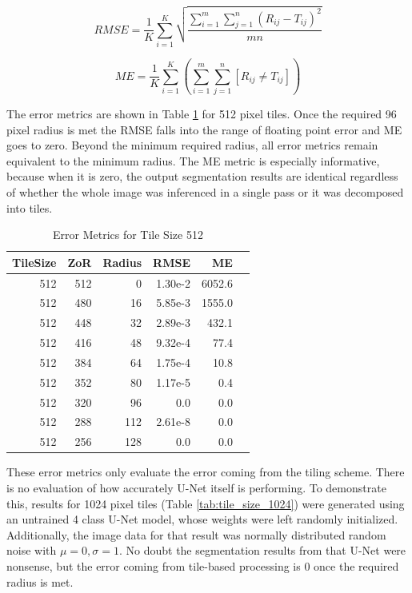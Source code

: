\documentclass[letterpaper]{article} %
\begin{document}
\begin{equation}
RMSE = \frac{1}{K} \sum_{i=1}^{K} \sqrt{ \frac{\sum_{i = 1}^{m} \sum_{j = 1}^{n} (R_{ij} - T_{ij})^2}{mn}}
\label{eq:rmse}
\end{equation}

\begin{equation}
ME = \frac{1}{K} \sum_{i=1}^{K} \left( \sum_{i = 1}^{m} \sum_{j = 1}^{n} [ R_{ij} \neq T_{ij} ] \right) 
\label{eq:me}
\end{equation}

The error metrics are shown in Table \ref{tab:tile_size_512} for 512 pixel tiles. Once the required 96 pixel radius is met the RMSE falls into the range of floating point error and ME goes to zero. Beyond the minimum required radius, all error metrics remain equivalent to the minimum radius. 
The ME metric is especially informative, because when it is zero, the output segmentation results are identical regardless of whether the whole image was inferenced in a single pass or it was decomposed into tiles. 

\begin{table}[h!]
	\centering
\caption{Error Metrics for Tile Size 512}
\label{tab:tile_size_512}
\begin{tabular}{rrrrrr}
	TileSize & ZoR & Radius & RMSE    & ME  \\ 
	\hline
512 & 512 & 0 & 1.30e-2 & 6052.6 \\
512 & 480 & 16 & 5.85e-3 & 1555.0 \\
512 & 448 & 32 & 2.89e-3 & 432.1 \\
512 & 416 & 48 & 9.32e-4 & 77.4 \\
512 & 384 & 64 & 1.75e-4 & 10.8 \\
512 & 352 & 80 & 1.17e-5 & 0.4 \\
512 & 320 & 96 & 0.0 & 0.0 \\
512 & 288 & 112 & 2.61e-8 & 0.0 \\
512 & 256 & 128 & 0.0 & 0.0 \\
\end{tabular}
\end{table}

These error metrics only evaluate the error coming from the tiling scheme. There is no evaluation of how accurately U-Net itself is performing. 
To demonstrate this, results for 1024 pixel tiles (Table \ref{tab:tile_size_1024}) were generated using an untrained 4 class U-Net model, whose weights were left randomly initialized. Additionally, the image data for that result was normally distributed random noise with $\mu = 0, \sigma = 1$. No doubt the segmentation results from that U-Net were nonsense, but the error coming from tile-based processing is 0 once the required radius is met.
\end{document}

